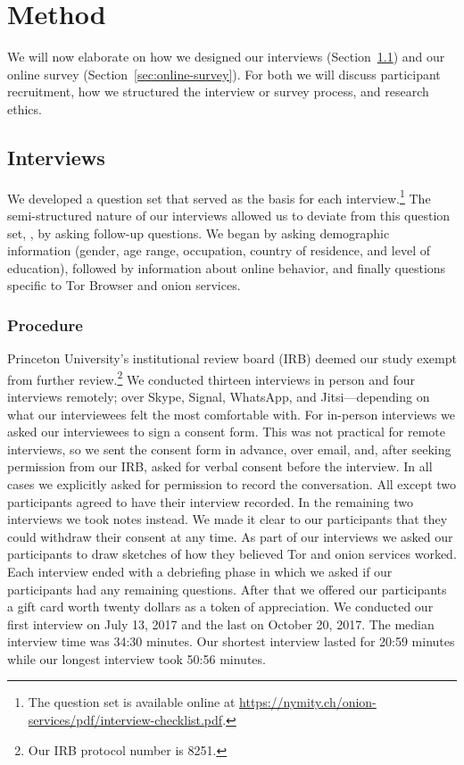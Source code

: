 \section{Method}
\label{sec:method}

We will now elaborate on how we designed our interviews
(Section~\ref{sec:interviews}) and our online survey
(Section~\ref{sec:online-survey}).  For both we will discuss participant
recruitment, how we structured the interview or survey process, and research
ethics.

\subsection{Interviews}
\label{sec:interviews}

We developed a question set that served as the basis for each
interview.\footnote{The question set is available online at
\url{https://nymity.ch/onion-services/pdf/interview-checklist.pdf}.}  The
semi-structured nature of our interviews allowed us to deviate from this
question set, \eg, by asking follow-up questions.  We began by asking
demographic information (gender, age range, occupation, country of residence,
and level of education), followed by information about online behavior, and
finally questions specific to Tor Browser and onion services.

\subsubsection{Procedure}

Princeton University's institutional review board (IRB) deemed our study exempt
from further review.\footnote{Our IRB protocol number is 8251.}  We conducted
thirteen interviews in person and four interviews remotely; over Skype, Signal,
WhatsApp, and Jitsi---depending on what our interviewees felt the most
comfortable with.  For in-person interviews we asked our interviewees to sign a
consent form.  This was not practical for remote interviews, so we sent the
consent form in advance, over email, and, after seeking permission from our IRB,
asked for verbal consent before the interview.  In all cases we explicitly asked
for permission to record the conversation.  All except two participants agreed
to have their interview recorded.  In the remaining two interviews we took notes
instead.  We made it clear to our participants that they could withdraw their
consent at any time.  As part of our interviews we asked our participants to
draw sketches of how they believed Tor and onion services worked.  Each
interview ended with a debriefing phase in which we asked if our participants
had any remaining questions.  After that we offered our participants a gift card
worth twenty dollars as a token of appreciation.  We conducted our first
interview on July 13, 2017 and the last on October 20, 2017.  The median
interview time was 34:30 minutes.  Our shortest interview lasted for 20:59
minutes while our longest interview took 50:56 minutes.

